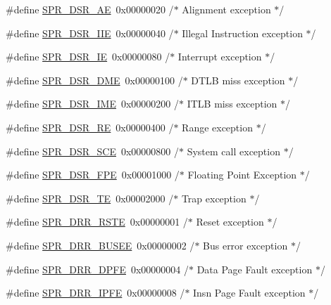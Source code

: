 \begin{DoxyCompactItemize}
\item 
\#define \hyperlink{spr-defs_8h_a7bace23dafc7e221f6fbc98a317afaf4}{\-S\-P\-R\-\_\-\-D\-S\-R\-\_\-\-A\-E}~0x00000020  /$\ast$ Alignment exception $\ast$/
\item 
\#define \hyperlink{spr-defs_8h_a591bb2979c61c4171cf4df88b0056dfc}{\-S\-P\-R\-\_\-\-D\-S\-R\-\_\-\-I\-I\-E}~0x00000040  /$\ast$ Illegal Instruction exception $\ast$/
\item 
\#define \hyperlink{spr-defs_8h_a1db95da7cbadd7e24dacdb2f0142d49a}{\-S\-P\-R\-\_\-\-D\-S\-R\-\_\-\-I\-E}~0x00000080  /$\ast$ Interrupt exception $\ast$/
\item 
\#define \hyperlink{spr-defs_8h_a0451cd39758dfe626171da3488b71c72}{\-S\-P\-R\-\_\-\-D\-S\-R\-\_\-\-D\-M\-E}~0x00000100  /$\ast$ D\-T\-L\-B miss exception $\ast$/
\item 
\#define \hyperlink{spr-defs_8h_a5d05dd89316e2e2c74ba4563bab89268}{\-S\-P\-R\-\_\-\-D\-S\-R\-\_\-\-I\-M\-E}~0x00000200  /$\ast$ I\-T\-L\-B miss exception $\ast$/
\item 
\#define \hyperlink{spr-defs_8h_a988935cbfb37262b88ec30097e71633e}{\-S\-P\-R\-\_\-\-D\-S\-R\-\_\-\-R\-E}~0x00000400  /$\ast$ Range exception $\ast$/
\item 
\#define \hyperlink{spr-defs_8h_adef3c6b56d24a4dbf3ab692d0fc9a3c5}{\-S\-P\-R\-\_\-\-D\-S\-R\-\_\-\-S\-C\-E}~0x00000800  /$\ast$ System call exception $\ast$/
\item 
\#define \hyperlink{spr-defs_8h_a499c38a4fefe2f1843b4e9da130e6a55}{\-S\-P\-R\-\_\-\-D\-S\-R\-\_\-\-F\-P\-E}~0x00001000  /$\ast$ Floating Point Exception $\ast$/
\item 
\#define \hyperlink{spr-defs_8h_ad8a86d0a5bc36f06a317b08a47e033a6}{\-S\-P\-R\-\_\-\-D\-S\-R\-\_\-\-T\-E}~0x00002000  /$\ast$ Trap exception $\ast$/
\item 
\#define \hyperlink{spr-defs_8h_a16b9c85748520559b637ee2925011840}{\-S\-P\-R\-\_\-\-D\-R\-R\-\_\-\-R\-S\-T\-E}~0x00000001  /$\ast$ Reset exception $\ast$/
\item 
\#define \hyperlink{spr-defs_8h_a16eec4c3e482893e63f7c9e03a1b9961}{\-S\-P\-R\-\_\-\-D\-R\-R\-\_\-\-B\-U\-S\-E\-E}~0x00000002  /$\ast$ Bus error exception $\ast$/
\item 
\#define \hyperlink{spr-defs_8h_aeef6aedf0cf20ef500aabfb34156bef1}{\-S\-P\-R\-\_\-\-D\-R\-R\-\_\-\-D\-P\-F\-E}~0x00000004  /$\ast$ Data Page Fault exception $\ast$/
\item 
\#define \hyperlink{spr-defs_8h_a090a70328675dfa42db902b5c21f090e}{\-S\-P\-R\-\_\-\-D\-R\-R\-\_\-\-I\-P\-F\-E}~0x00000008  /$\ast$ Insn Page Fault exception $\ast$/

\end{DoxyCompactItemize}

